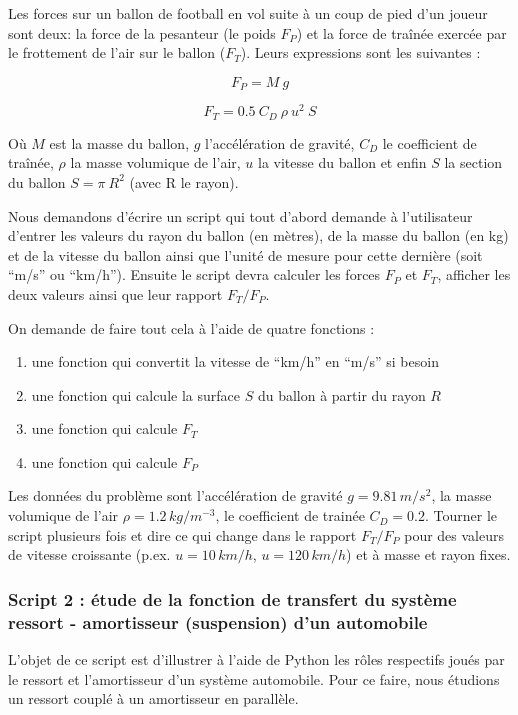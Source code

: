\documentclass{article}
\begin{document}
    Les forces sur un ballon de football en vol suite à un coup de pied d'un
joueur sont deux: la force de la pesanteur (le poids \(F_P\)) et la
force de traînée exercée par le frottement de l'air sur le ballon
(\(F_T\)). Leurs expressions sont les suivantes :

    \[F_P = M\ g\]

\[F_T = 0.5 \ C_D \ \rho \ u^2\ S \]

    Où \(M\) est la masse du ballon, \(g\) l'accélération de gravité,
\(C_D\) le coefficient de traînée, \(\rho\) la masse volumique de l'air,
\(u\) la vitesse du ballon et enfin \(S\) la section du ballon
\(S=\pi\ R^2\) (avec R le rayon).

    Nous demandons d'écrire un script qui tout d'abord demande à
l'utilisateur d'entrer les valeurs du rayon du ballon (en mètres), de la
masse du ballon (en kg) et de la vitesse du ballon ainsi que l'unité de
mesure pour cette dernière (soit ``m/s'' ou ``km/h''). Ensuite le script
devra calculer les forces \(F_P\) et \(F_T\), afficher les deux valeurs
ainsi que leur rapport \(F_T/F_P\).

    On demande de faire tout cela à l'aide de quatre fonctions :

\begin{enumerate}
\def\labelenumi{\arabic{enumi})}
\item
  une fonction qui convertit la vitesse de ``km/h'' en ``m/s'' si besoin
\item
  une fonction qui calcule la surface \(S\) du ballon à partir du rayon
  \(R\)
\item
  une fonction qui calcule \(F_T\)
\item
  une fonction qui calcule \(F_P\)
\end{enumerate}

    Les données du problème sont l'accélération de gravité
\(g=9.81 \, m /s^2\), la masse volumique de l'air
\(\rho = 1.2 \, kg/m^{-3}\), le coefficient de trainée \(C_D=0.2\).
Tourner le script plusieurs fois et dire ce qui change dans le rapport
\(F_T/F_P\) pour des valeurs de vitesse croissante (p.ex.
\(u=10 \, km/h\), \(u=120 \, km/h\)) et à masse et rayon fixes.


    \subsubsection{Script 2 : étude de la fonction de transfert du système ressort -
amortisseur (suspension) d'un automobile}


    L'objet de ce script est d'illustrer à l'aide de Python les rôles
respectifs joués par le ressort et l'amortisseur d'un système
automobile. Pour ce faire, nous étudions un ressort couplé à un
amortisseur en parallèle.
\end{document}

